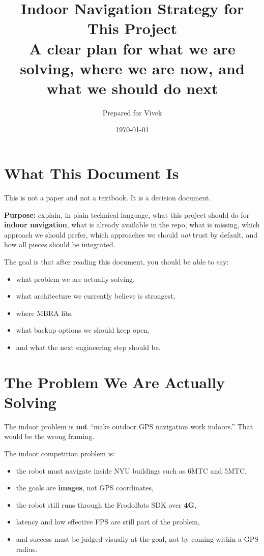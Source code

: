 \documentclass[11pt,a4paper]{article}
\title{Indoor Navigation Strategy for This Project\\[0.3em]
\large A clear plan for what we are solving, where we are now, and what we should do next}
\author{Prepared for Vivek}
\date{\today}
\begin{document}
\maketitle
\tableofcontents
\newpage

\section{What This Document Is}

This is not a paper and not a textbook. It is a decision document.

\begin{mdframed}
\textbf{Purpose:} explain, in plain technical language, what this project
should do for \textbf{indoor navigation}, what is already available in the
repo, what is missing, which approach we should prefer, which approaches we
should \emph{not} trust by default, and how all pieces should be integrated.
\end{mdframed}

The goal is that after reading this document, you should be able to say:
\begin{itemize}[nosep]
  \item what problem we are actually solving,
  \item what architecture we currently believe is strongest,
  \item where MBRA fits,
  \item what backup options we should keep open,
  \item and what the next engineering step should be.
\end{itemize}


\section{The Problem We Are Actually Solving}

The indoor problem is \textbf{not} ``make outdoor GPS navigation work indoors.''
That would be the wrong framing.

The indoor competition problem is:
\begin{itemize}[nosep]
  \item the robot must navigate inside NYU buildings such as 6MTC and 5MTC,
  \item the goals are \textbf{images}, not GPS coordinates,
  \item the robot still runs through the FrodoBots SDK over \textbf{4G},
  \item latency and low effective FPS are still part of the problem,
  \item and success must be judged visually at the goal, not by coming within
        a GPS radius.
\end{itemize}
\end{document}
